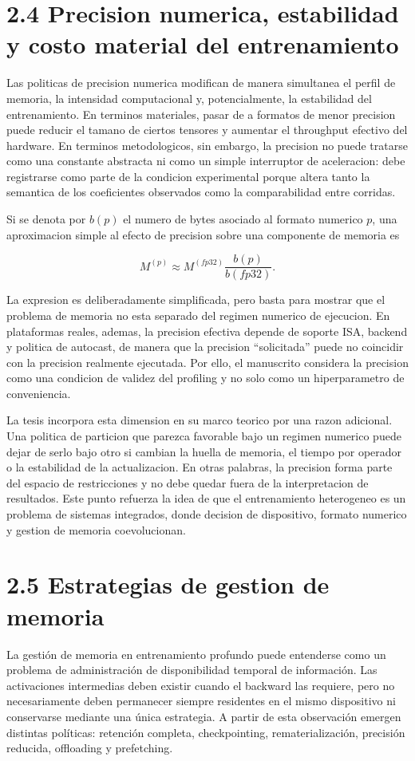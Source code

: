 \section{2.4 Precision numerica, estabilidad y costo material del entrenamiento}
Las politicas de precision numerica modifican de manera simultanea el perfil de memoria, la intensidad computacional y, potencialmente, la estabilidad del entrenamiento. En terminos materiales, pasar de  a formatos de menor precision puede reducir el tamano de ciertos tensores y aumentar el throughput efectivo del hardware. En terminos metodologicos, sin embargo, la precision no puede tratarse como una constante abstracta ni como un simple interruptor de aceleracion: debe registrarse como parte de la condicion experimental porque altera tanto la semantica de los coeficientes observados como la comparabilidad entre corridas.

Si se denota por $b(p)$ el numero de bytes asociado al formato numerico $p$, una aproximacion simple al efecto de precision sobre una componente de memoria es

$$
M^{(p)} \approx M^{(fp32)}\frac{b(p)}{b(fp32)}.
$$

La expresion es deliberadamente simplificada, pero basta para mostrar que el problema de memoria no esta separado del regimen numerico de ejecucion. En plataformas reales, ademas, la precision efectiva depende de soporte ISA, backend y politica de autocast, de manera que la precision ``solicitada'' puede no coincidir con la precision realmente ejecutada. Por ello, el manuscrito considera la precision como una condicion de validez del profiling y no solo como un hiperparametro de conveniencia.

La tesis incorpora esta dimension en su marco teorico por una razon adicional. Una politica de particion que parezca favorable bajo un regimen numerico puede dejar de serlo bajo otro si cambian la huella de memoria, el tiempo por operador o la estabilidad de la actualizacion. En otras palabras, la precision forma parte del espacio de restricciones y no debe quedar fuera de la interpretacion de resultados. Este punto refuerza la idea de que el entrenamiento heterogeneo es un problema de sistemas integrados, donde decision de dispositivo, formato numerico y gestion de memoria coevolucionan.

\section{2.5 Estrategias de gestion de memoria}
La gestión de memoria en entrenamiento profundo puede entenderse como un problema de administración de disponibilidad temporal de información. Las activaciones intermedias deben existir cuando el backward las requiere, pero no necesariamente deben permanecer siempre residentes en el mismo dispositivo ni conservarse mediante una única estrategia. A partir de esta observación emergen distintas políticas: retención completa, checkpointing, rematerialización, precisión reducida, offloading y prefetching.

